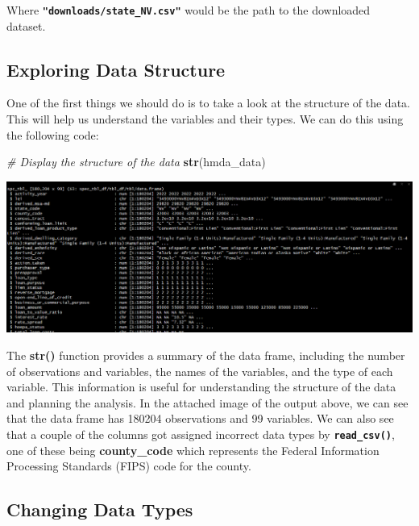 \documentclass[
]{book}
\newenvironment{Shaded}{\begin{snugshade}}{\end{snugshade}}
\newcommand{\CommentTok}[1]{\textcolor[rgb]{0.56,0.35,0.01}{\textit{#1}}}
\newcommand{\FunctionTok}[1]{\textcolor[rgb]{0.13,0.29,0.53}{\textbf{#1}}}
\newcommand{\NormalTok}[1]{#1}
\begin{document}
Where \textbf{\texttt{"downloads/state\_NV.csv"}} would be the path to the downloaded dataset.

\hypertarget{exploring-data-structure}{%
\subsection{Exploring Data Structure}\label{exploring-data-structure}}

One of the first things we should do is to take a look at the structure of the data. This will help us understand the variables and their types. We can do this using the following code:

\begin{Shaded}
\begin{Highlighting}[]
\CommentTok{\# Display the structure of the data}
\FunctionTok{str}\NormalTok{(hmda\_data)}
\end{Highlighting}
\end{Shaded}

\includegraphics{images/structure_printout.png}

The \textbf{str()} function provides a summary of the data frame, including the number of observations and variables, the names of the variables, and the type of each variable. This information is useful for understanding the structure of the data and planning the analysis. In the attached image of the output above, we can see that the data frame has 180204 observations and 99 variables. We can also see that a couple of the columns got assigned incorrect data types by \textbf{\texttt{read\_csv()}}, one of these being \textbf{county\_code} which represents the Federal Information Processing Standards (FIPS) code for the county.

\hypertarget{changing-data-types}{%
\subsection{Changing Data Types}\label{changing-data-types}}
\end{document}
